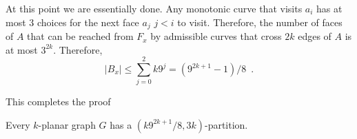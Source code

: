 \documentclass{patmorin}
\begin{document}
At this point we are essentially done.  Any monotonic curve that visits $a_i$ has at most 3 choices for the next face $a_j$ $j<i$ to visit.  Therefore, the number of faces of $A$ that can be reached from $F_x$ by admissible curves that cross $2k$ edges of $A$ is at most $3^{2k}$. Therefore,
\[
   |B_x| \le \sum_{j=0}^2k 9^j = (9^{2k+1}-1)/8 \enspace .
\]

This completes the proof

\begin{thm}
    Every $k$-planar graph $G$ has a $(k9^{2k+1}/8,3k)$-partition.
\end{thm}



\end{document}
